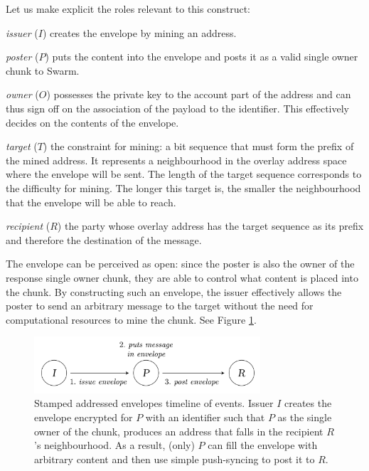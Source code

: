 Let us make explicit the roles relevant to this construct:

\begin{labelledlist}
\item[\emph{issuer} ($I$)] creates the envelope by mining an address. 
\item[\emph{poster} ($P$)] puts the content into the envelope and posts it as a valid single owner chunk to Swarm.
\item[\emph{owner} ($O$)] possesses the private key to the account part of the address and can thus sign off on the association of the payload to the identifier. This effectively decides on the contents of the envelope.
\item[\emph{target} ($T$)] the constraint for mining: a bit sequence that must form the prefix of the mined address. It represents a neighbourhood in the overlay address space where the envelope will be sent. The length of the target sequence corresponds to the difficulty for mining. The longer this target is, the smaller the neighbourhood that the envelope will be able to reach.
\item[\emph{recipient} ($R$)] the party whose overlay address has the target sequence as its prefix and therefore the destination of the message.
\end{labelledlist}

The envelope can be perceived as open: since the poster is also the owner of the response single owner chunk, they are able to control what content is placed into the chunk. By constructing such an envelope, the issuer effectively allows the poster to send an arbitrary message to the target without the need for computational resources to mine the chunk. See Figure \ref{fig:addressed-envelope-events}. 


\begin{figure}[htbp]
   \centering
   \includegraphics[width=0.75\textwidth]{fig/prepaid-addressed-envelopes-events.pdf}
   \caption[Stamped addressed envelope's timeline of events \statusgreen]{Stamped addressed envelopes timeline of events. Issuer $I$ creates the envelope encrypted for $P$ with an identifier such that $P$ as the single owner of the chunk, produces an address that falls in the recipient $R$'s neighbourhood. As a result, (only) $P$ can fill the envelope with arbitrary content and then use simple push-syncing to post it to $R$.}
   \label{fig:addressed-envelope-events}
\end{figure}

